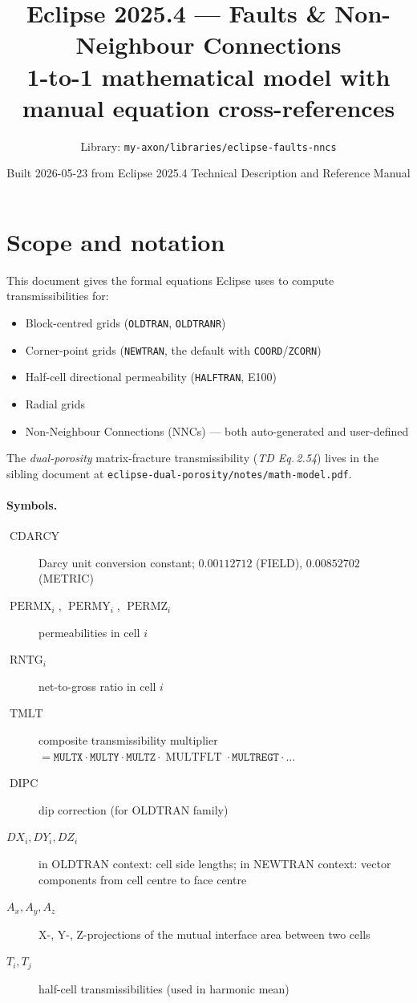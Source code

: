 \documentclass[11pt,a4paper]{article}
\title{\textbf{Eclipse 2025.4 — Faults \& Non-Neighbour Connections}\\
       \large 1-to-1 mathematical model with manual equation cross-references}
\author{Library: \texttt{my-axon/libraries/eclipse-faults-nncs}}
\date{Built 2026-05-23 from Eclipse 2025.4 Technical Description and Reference Manual}
\newcommand{\TDref}[1]{\textit{TD Eq.\,#1}}
\newcommand{\kw}[1]{\texttt{#1}}
\DeclareMathOperator{\CDARCY}{CDARCY}
\DeclareMathOperator{\TMLT}{TMLT}
\DeclareMathOperator{\DIPC}{DIPC}
\DeclareMathOperator{\RNTG}{RNTG}
\DeclareMathOperator{\MULTFLT}{MULTFLT}
\DeclareMathOperator{\PERMX}{PERMX}
\DeclareMathOperator{\PERMY}{PERMY}
\DeclareMathOperator{\PERMZ}{PERMZ}
\begin{document}
\maketitle

\section{Scope and notation}

This document gives the formal equations Eclipse uses to compute transmissibilities for:
\begin{itemize}
  \item Block-centred grids (\kw{OLDTRAN}, \kw{OLDTRANR})
  \item Corner-point grids (\kw{NEWTRAN}, the default with \kw{COORD}/\kw{ZCORN})
  \item Half-cell directional permeability (\kw{HALFTRAN}, E100)
  \item Radial grids
  \item Non-Neighbour Connections (NNCs) — both auto-generated and user-defined
\end{itemize}

The \emph{dual-porosity} matrix-fracture transmissibility (\TDref{2.54}) lives in the
sibling document at \texttt{eclipse-dual-porosity/notes/math-model.pdf}.

\paragraph{Symbols.}
\begin{description}
  \item[$\CDARCY$] Darcy unit conversion constant; $0.00112712$ (FIELD), $0.00852702$ (METRIC)
  \item[$\PERMX_i$, $\PERMY_i$, $\PERMZ_i$] permeabilities in cell $i$
  \item[$\RNTG_i$] net-to-gross ratio in cell $i$
  \item[$\TMLT$] composite transmissibility multiplier $= \kw{MULTX}\cdot\kw{MULTY}\cdot\kw{MULTZ}\cdot\MULTFLT\cdot\kw{MULTREGT}\cdot\ldots$
  \item[$\DIPC$] dip correction (for OLDTRAN family)
  \item[$DX_i, DY_i, DZ_i$] in OLDTRAN context: cell side lengths;
                              in NEWTRAN context: vector components from cell centre to face centre
  \item[$A_x, A_y, A_z$] X-, Y-, Z-projections of the mutual interface area between two cells
  \item[$T_i, T_j$] half-cell transmissibilities (used in harmonic mean)
\end{description}
\end{document}
